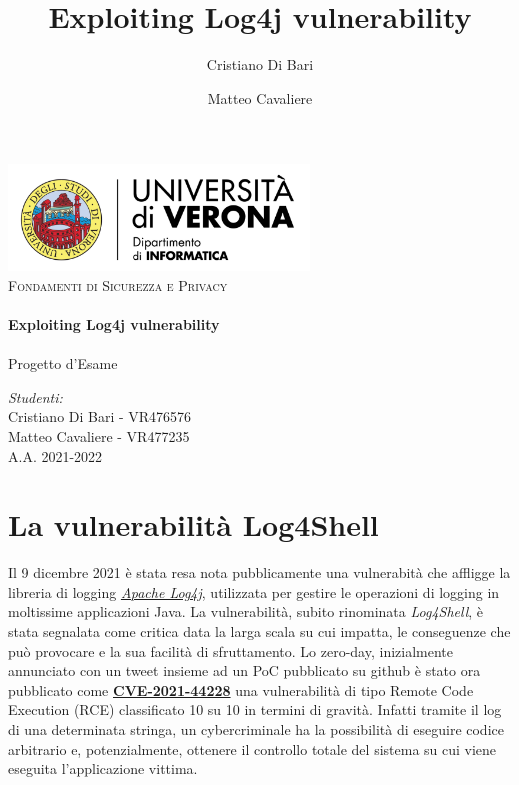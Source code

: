\documentclass[a4paper, 12pt]{article}
\title{Exploiting Log4j vulnerability}
\author{Cristiano Di Bari}
\author{Matteo Cavaliere}
\begin{document}
\begin{titlepage}
    \vbox{ }

    \begin{center}
        \includegraphics[width=0.60\textwidth]{img/univr-di-logo.png}\\[2cm]
        \textsc{\Large Fondamenti di Sicurezza e Privacy}\\[0.6cm]

        \noindent\makebox[\linewidth]{\rule{.7\paperwidth}{.6pt}}\\[0.7cm]
        { \huge \bfseries Exploiting Log4j vulnerability}\\[0.25cm]
        \noindent\makebox[\linewidth]{\rule{.7\paperwidth}{.6pt}}\\[0.7cm]
        \large{Progetto d'Esame}\\[1.2cm]
        \vfill
        \large
        
        \emph{Studenti:}\\[1mm]
        Cristiano Di Bari  - VR476576  \\[1mm]
        Matteo Cavaliere - VR477235  \\[2cm]

        {\large A.A. 2021-2022}
    \end{center}
\end{titlepage}

\tableofcontents
\newpage

\section{La vulnerabilità Log4Shell}
Il 9 dicembre 2021 è stata resa nota pubblicamente una vulnerabità che affligge la libreria di logging \emph{\href{https://logging.apache.org/log4j/2.x/}{Apache Log4j}}, utilizzata per gestire le operazioni di logging in moltissime applicazioni Java.
La vulnerabilità, subito rinominata \emph{Log4Shell}, è stata segnalata come critica data la larga scala su cui impatta, le conseguenze che può provocare e la sua facilità di sfruttamento.
Lo zero-day, inizialmente annunciato con un tweet insieme ad un PoC pubblicato su github è stato ora pubblicato come \textbf{\href{https://nvd.nist.gov/vuln/detail/CVE-2021-44228}{CVE-2021-44228}}  una vulnerabilità di tipo Remote Code Execution (RCE) classificato 10 su 10 in termini di gravità. Infatti tramite il log di una determinata stringa, un cybercriminale ha la possibilità di eseguire codice arbitrario e, potenzialmente, ottenere il controllo totale del sistema su cui viene eseguita l'applicazione vittima.
\end{document}

